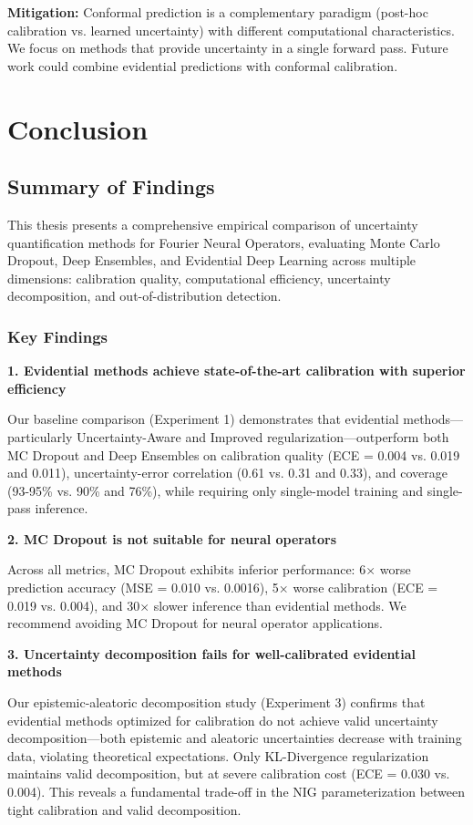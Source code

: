 \textbf{Mitigation:} Conformal prediction is a complementary paradigm (post-hoc calibration vs. learned uncertainty) with different computational characteristics. We focus on methods that provide uncertainty in a single forward pass. Future work could combine evidential predictions with conformal calibration.


\chapter{Conclusion}

\section{Summary of Findings}

This thesis presents a comprehensive empirical comparison of uncertainty quantification methods for Fourier Neural Operators, evaluating Monte Carlo Dropout, Deep Ensembles, and Evidential Deep Learning across multiple dimensions: calibration quality, computational efficiency, uncertainty decomposition, and out-of-distribution detection.

\subsection{Key Findings}

\textbf{1. Evidential methods achieve state-of-the-art calibration with superior efficiency}

Our baseline comparison (Experiment 1) demonstrates that evidential methods—particularly Uncertainty-Aware and Improved regularization—outperform both MC Dropout and Deep Ensembles on calibration quality (ECE = 0.004 vs. 0.019 and 0.011), uncertainty-error correlation (0.61 vs. 0.31 and 0.33), and coverage (93-95\% vs. 90\% and 76\%), while requiring only single-model training and single-pass inference.

\textbf{2. MC Dropout is not suitable for neural operators}

Across all metrics, MC Dropout exhibits inferior performance: 6× worse prediction accuracy (MSE = 0.010 vs. 0.0016), 5× worse calibration (ECE = 0.019 vs. 0.004), and 30× slower inference than evidential methods. We recommend avoiding MC Dropout for neural operator applications.

\textbf{3. Uncertainty decomposition fails for well-calibrated evidential methods}

Our epistemic-aleatoric decomposition study (Experiment 3) confirms that evidential methods optimized for calibration do not achieve valid uncertainty decomposition—both epistemic and aleatoric uncertainties decrease with training data, violating theoretical expectations. Only KL-Divergence regularization maintains valid decomposition, but at severe calibration cost (ECE = 0.030 vs. 0.004). This reveals a fundamental trade-off in the NIG parameterization between tight calibration and valid decomposition.

